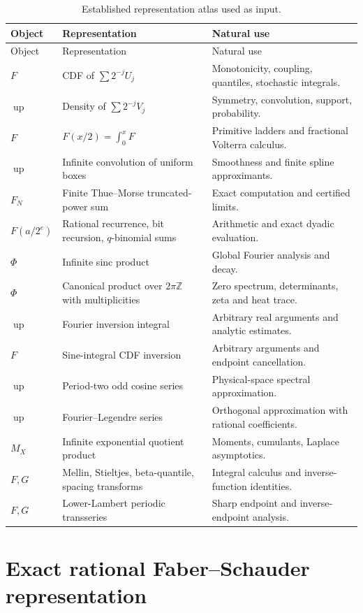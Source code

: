 \documentclass[11pt,oneside]{article}
\theoremstyle{definition}
\theoremstyle{remark}
\newcommand{\Z}{\mathbb Z}
\newcommand{\Up}{\operatorname{up}}
\newcommand{\1}{\mathbf 1}
\begin{document}
\begin{longtable}{@{}p{}p{}p{}@{}}
\caption{Established representation atlas used as input.}\label{tab:atlas}\\
\toprule
Object & Representation & Natural use \\
\midrule
\endfirsthead
\toprule
Object & Representation & Natural use \\
\midrule
\endhead
$F$ & CDF of $\sum2^{-j}U_j$ & Monotonicity, coupling, quantiles, stochastic integrals.\\
$\Up$ & Density of $\sum2^{-j}V_j$ & Symmetry, convolution, support, probability.\\
$F$ & $F(x/2)=\int_0^xF$ & Primitive ladders and fractional Volterra calculus.\\
$\Up$ & Infinite convolution of uniform boxes & Smoothness and finite spline approximants.\\
$F_N$ & Finite Thue--Morse truncated-power sum & Exact computation and certified limits.\\
$F(a/2^e)$ & Rational recurrence, bit recursion, $q$-binomial sums & Arithmetic and exact dyadic evaluation.\\
$\Phi$ & Infinite sinc product & Global Fourier analysis and decay.\\
$\Phi$ & Canonical product over $2\pi\Z$ with multiplicities & Zero spectrum, determinants, zeta and heat trace.\\
$\Up$ & Fourier inversion integral & Arbitrary real arguments and analytic estimates.\\
$F$ & Sine-integral CDF inversion & Arbitrary arguments and endpoint cancellation.\\
$\Up$ & Period-two odd cosine series & Physical-space spectral approximation.\\
$\Up$ & Fourier--Legendre series & Orthogonal approximation with rational coefficients.\\
$M_X$ & Infinite exponential quotient product & Moments, cumulants, Laplace asymptotics.\\
$F,G$ & Mellin, Stieltjes, beta-quantile, spacing transforms & Integral calculus and inverse-function identities.\\
$F,G$ & Lower-Lambert periodic transseries & Sharp endpoint and inverse-endpoint analysis.\\
\bottomrule
\end{longtable}

\section{Exact rational Faber--Schauder representation}
\label{sec:faber}
\end{document}
